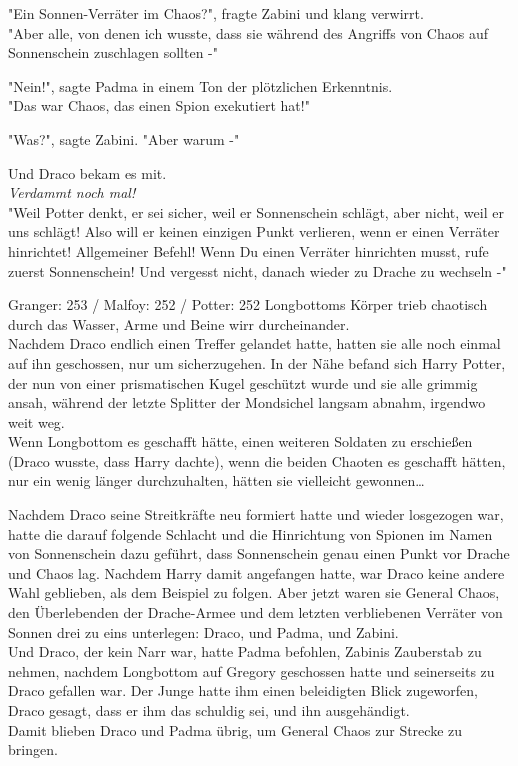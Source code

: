 {"Ein Sonnen-Verräter im Chaos?", fragte Zabini und klang verwirrt.\\ "Aber alle, von denen ich wusste, dass sie während des Angriffs von Chaos auf Sonnenschein zuschlagen sollten -"

"Nein!", sagte Padma in einem Ton der plötzlichen Erkenntnis.\\ "Das war Chaos, das einen Spion exekutiert hat!"

"Was?", sagte Zabini. "Aber warum -"

Und Draco bekam es mit.\\ \emph{Verdammt noch mal!}\\ "Weil Potter denkt, er sei sicher, weil er Sonnenschein schlägt, aber nicht, weil er uns schlägt! Also will er keinen einzigen Punkt verlieren, wenn er einen Verräter hinrichtet! Allgemeiner Befehl! Wenn Du einen Verräter hinrichten musst, rufe zuerst Sonnenschein! Und vergesst nicht, danach wieder zu Drache zu wechseln -"

Granger: 253 / Malfoy: 252 / Potter: 252 Longbottoms Körper trieb chaotisch durch das Wasser, Arme und Beine wirr durcheinander.\\ Nachdem Draco endlich einen Treffer gelandet hatte, hatten sie alle noch einmal auf ihn geschossen, nur um sicherzugehen. In der Nähe befand sich Harry Potter, der nun von einer prismatischen Kugel geschützt wurde und sie alle grimmig ansah, während der letzte Splitter der Mondsichel langsam abnahm, irgendwo weit weg.\\ Wenn Longbottom es geschafft hätte, einen weiteren Soldaten zu erschießen (Draco wusste, dass Harry dachte), wenn die beiden Chaoten es geschafft hätten, nur ein wenig länger durchzuhalten, hätten sie vielleicht gewonnen…

Nachdem Draco seine Streitkräfte neu formiert hatte und wieder losgezogen war, hatte die darauf folgende Schlacht und die Hinrichtung von Spionen im Namen von Sonnenschein dazu geführt, dass Sonnenschein genau einen Punkt vor Drache und Chaos lag. Nachdem Harry damit angefangen hatte, war Draco keine andere Wahl geblieben, als dem Beispiel zu folgen. Aber jetzt waren sie General Chaos, den Überlebenden der Drache-Armee und dem letzten verbliebenen Verräter von Sonnen drei zu eins unterlegen: Draco, und Padma, und Zabini.\\ Und Draco, der kein Narr war, hatte Padma befohlen, Zabinis Zauberstab zu nehmen, nachdem Longbottom auf Gregory geschossen hatte und seinerseits zu Draco gefallen war. Der Junge hatte ihm einen beleidigten Blick zugeworfen, Draco gesagt, dass er ihm das schuldig sei, und ihn ausgehändigt.\\ Damit blieben Draco und Padma übrig, um General Chaos zur Strecke zu bringen.

}
